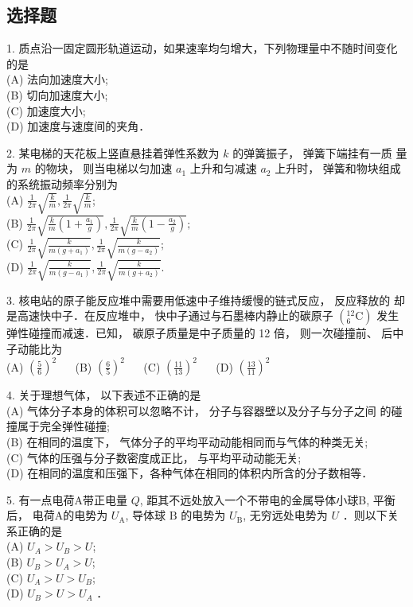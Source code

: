 \subsection{选择题}
1. 质点沿一固定圆形轨道运动，如果速率均匀增大，下列物理量中不随时间变化的是\\
(A) 法向加速度大小;\\
(B) 切向加速度大小;\\
(C) 加速度大小;\\
(D) 加速度与速度间的夹角．

2. 某电梯的天花板上竖直悬挂着弹性系数为 $k$ 的弹簧振子， 弹簧下端挂有一质 量为 $m$ 的物块， 则当电梯以匀加速 $a_{1}$ 上升和匀减速 $a_{2}$ 上升时， 弹簧和物块组成的系统振动频率分别为\\
(A) $\frac{1}{2 \pi} \sqrt{\frac{k}{m}},\frac{1}{2 \pi} \sqrt{\frac{k}{m}}$;\\
(B) $\frac{1}{2 \pi} \sqrt{\frac{k}{m}\left(1+\frac{a_{1}}{g}\right)},\frac{1}{2 \pi} \sqrt{\frac{k}{m}\left(1-\frac{a_{2}}{g}\right)} ;$\\
(C) $\frac{1}{2 \pi} \sqrt{\frac{k}{m\left(g+a_{1}\right)}},\frac{1}{2 \pi} \sqrt{\frac{k}{m\left(g-a_{2}\right)}} ;$\\
(D) $\frac{1}{2 \pi} \sqrt{\frac{k}{m\left(g-a_{1}\right)}},\frac{1}{2 \pi} \sqrt{\frac{k}{m\left(g+a_{2}\right)}} .$

3. 核电站的原子能反应堆中需要用低速中子维持缓慢的链式反应， 反应释放的 却是高速快中子．在反应堆中， 快中子通过与石墨棒内静止的碳原子 $\left({ }_{6}^{12} \mathrm{C}\right)$ 发生弹性碰撞而减速．已知， 碳原子质量是中子质量的 12 倍， 则一次碰撞前、 后中子动能比为\\
(A) $\left(\frac{5}{6}\right)^{2}$ $\quad$
(B) $\left(\frac{6}{5}\right)^{2}$ $\quad$
(C) $\left(\frac{11}{13}\right)^{2}$ $\quad$
(D) $\left(\frac{13}{11}\right)^{2}$ 

4. 关于理想气体， 以下表述不正确的是\\
(A) 气体分子本身的体积可以忽略不计， 分子与容器壁以及分子与分子之间 的碰撞属于完全弹性碰撞;\\
(B) 在相同的温度下， 气体分子的平均平动动能相同而与气体的种类无关;\\
(C) 气体的压强与分子数密度成正比， 与平均平动动能无关;\\
(D) 在相同的温度和压强下，各种气体在相同的体积内所含的分子数相等．

5. 有一点电荷A带正电量 $Q$, 距其不远处放入一个不带电的金属导体小球B, 平衡后， 电荷A的电势为 $U_{\mathrm{A}}$, 导体球 $\mathrm{B}$ 的电势为 $U_{\mathrm{B}}$, 无穷远处电势为 $U$ ．则以下关系正确的是\\
(A) $U_{A}>U_{B}>U$;\\
(B) $U_{B}>U_{A}>U$;\\
(C) $U_{A}>U>U_{B}$;\\
(D) $U_{B}>U>U_{A}$ ．

